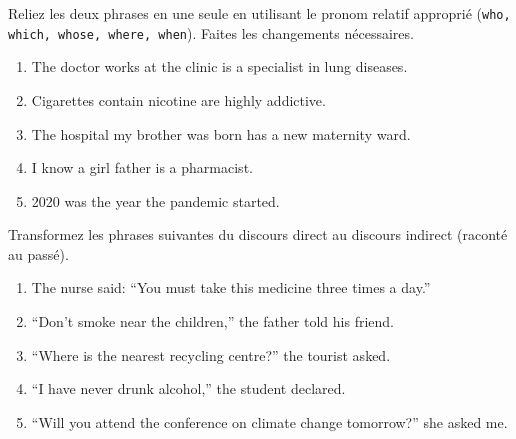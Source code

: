\documentclass[11pt]{article}
\begin{document}
\begin{exercice}
Reliez les deux phrases en une seule en utilisant le pronom relatif approprié (\texttt{who, which, whose, where, when}). Faites les changements nécessaires.
\begin{enumerate}
    \item The doctor \underline{\hspace{5cm}} works at the clinic is a specialist in lung diseases.
    \item Cigarettes \underline{\hspace{5cm}} contain nicotine are highly addictive.
    \item The hospital \underline{\hspace{5cm}} my brother was born has a new maternity ward.
    \item I know a girl \underline{\hspace{5cm}} father is a pharmacist.
    \item 2020 was the year \underline{\hspace{5cm}} the pandemic started.
\end{enumerate}
\end{exercice}

\begin{exercice}
Transformez les phrases suivantes du discours direct au discours indirect (raconté au passé).
\begin{enumerate}
    \item The nurse said: ``You must take this medicine three times a day.''
    \item ``Don't smoke near the children,'' the father told his friend.
    \item ``Where is the nearest recycling centre?'' the tourist asked.
    \item ``I have never drunk alcohol,'' the student declared.
    \item ``Will you attend the conference on climate change tomorrow?'' she asked me.
\end{enumerate}
\end{exercice}
\end{document}
